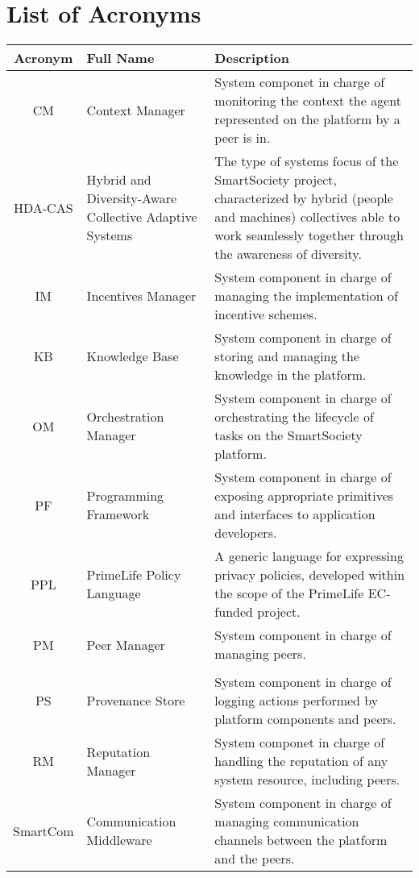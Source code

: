 \documentclass{SmartReport}
\begin{document}
\section*{List of Acronyms}
\begin{tabular}{|c|p{3cm}|p{10cm}|}
\hline 
\textbf{Acronym} & \textbf{Full Name} & \textbf{Description} \\
\hline 
\hline 
CM & Context Manager & System componet in charge of monitoring the
context the agent represented on the platform by a peer is in.\\
\hline
HDA-CAS & Hybrid and Diversity-Aware Collective Adaptive Systems & The
type of systems focus of the SmartSociety project, characterized by
hybrid (people and machines) collectives able to work seamlessly
together through the awareness of diversity. \\ 
\hline
IM & Incentives Manager & System component in charge of managing the implementation of incentive schemes.\\  
\hline 
KB & Knowledge Base &  System component in charge of storing and managing the knowledge in the platform.\\
\hline
OM & Orchestration Manager &  System component in charge of
orchestrating the lifecycle of tasks on the SmartSociety platform. \\
\hline 
PF & Programming Framework &  System component in charge of exposing
appropriate primitives and interfaces to application developers.\\
PPL & PrimeLife Policy Language & A generic language for expressing
privacy policies, developed within the scope of the PrimeLife
EC-funded project. \\
\hline 
PM & Peer Manager &  System component in charge of managing peers.\\
\hline \\
PS & Provenance Store & System component in charge of logging actions performed by platform components and peers.\\
\hline
RM & Reputation Manager & System componet in charge of handling the reputation of any system resource, including peers. \\
\hline
SmartCom & Communication Middleware & System component in charge of managing
communication channels between the platform and the peers. \\
\hline
\end{tabular}
\end{document}
